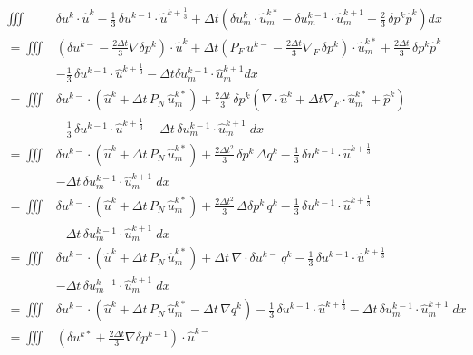\[\begin{split}
   \iiint & \delta u^k \cdot \hat u^k -
   \frac13\, \delta u^{k-1} \cdot \hat u^{k+\frac13} +
   \Delta t \left( \delta u_m^k \cdot \hat u_m^{k*} -
                   \delta u_m^{k-1} \cdot \hat u_m^{k+1} +
                   \frac23\, \delta p^k \hat p^k \right) dx \\
 =  \iiint & \left(\delta u^{k-} - \frac{2 \Delta t}3 \nabla \delta p^k\right)
            \cdot \hat u^k
  + \Delta t \left(P_F\, u^{k-} - \frac{2\Delta t}3 \nabla_F\, \delta p^k\right)
              \cdot \hat u_m^{k*}
  + \frac{2\Delta t}{3}\, \delta p^k \hat p^k \\
 &- \frac13\, \delta u^{k-1} \cdot \hat u^{k+\frac13}
  - \Delta t \delta u_m^{k-1} \cdot \hat u_m^{k+1} dx \\
 =  \iiint & \delta u^{k-} \cdot
    \left(\hat u^k + \Delta t\, P_N\, \hat u_m^{k*}\right)
  + \frac{2\Delta t}3\, \delta p^k
    \left( \nabla \cdot \hat u^k + \Delta t \nabla_F \cdot \hat u_m^{k*}
         + \hat p^k \right) \\
 &- \frac13\, \delta u^{k-1} \cdot \hat u^{k+\frac13}
  - \Delta t\, \delta u_m^{k-1} \cdot \hat u_m^{k+1}\; dx \\
 =  \iiint & \delta u^{k-} \cdot
    \left(\hat u^k + \Delta t\, P_N\, \hat u_m^{k*}\right)
  + \frac{2\Delta t^2}3\, \delta p^k\, \Delta q^k
  - \frac13\, \delta u^{k-1} \cdot \hat u^{k+\frac13} \\
 &- \Delta t\, \delta u_m^{k-1} \cdot \hat u_m^{k+1}\; dx \\
 =  \iiint & \delta u^{k-} \cdot
    \left(\hat u^k + \Delta t\, P_N\, \hat u_m^{k*}\right)
  + \frac{2\Delta t^2}3\, \Delta \delta p^k\, q^k
  - \frac13\, \delta u^{k-1} \cdot \hat u^{k+\frac13} \\
 &- \Delta t\, \delta u_m^{k-1} \cdot \hat u_m^{k+1}\; dx \\
 =  \iiint & \delta u^{k-} \cdot
    \left(\hat u^k + \Delta t\, P_N\, \hat u_m^{k*}\right)
  + \Delta t\, \nabla \cdot \delta u^{k-}\, q^k
  - \frac13\, \delta u^{k-1} \cdot \hat u^{k+\frac13} \\
 &- \Delta t\, \delta u_m^{k-1} \cdot \hat u_m^{k+1}\; dx \\
 =  \iiint & \delta u^{k-} \cdot
    \left(\hat u^k + \Delta t\, P_N\, \hat u_m^{k*}
     - \Delta t\, \nabla q^k \right)
  - \frac13\, \delta u^{k-1} \cdot \hat u^{k+\frac13}
  - \Delta t\, \delta u_m^{k-1} \cdot \hat u_m^{k+1}\; dx \\
 =  \iiint & \left(\delta u^{k*}
    + \frac{2 \Delta t}{3} \nabla \delta p^{k-1}\right) \cdot \hat u^{k-}

\end{split}\]
